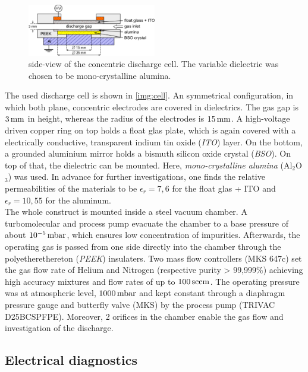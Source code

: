 \documentclass[a4paper,10pt,twoside]{article}
\newcommand{\tenpo}[1]{ 10^{#1}}
\newcommand{\tilt}[1]{\textit{#1}}
\begin{document}
				\begin{figure}
					\centering
					\includegraphics[width=0.5\textwidth]{figures/setup/discharge_cell.pdf}
					\caption{side-view of the concentric discharge cell. The variable dielectric was chosen to be mono-crystalline alumina.}
					\label{img:cell}
				\end{figure}
		
			The used discharge cell is shown in \autoref{img:cell}. An symmetrical configuration, in which both plane, concentric electrodes are covered in dielectrics. The gas gap is $\unit[3]{mm}$ in height, whereas the radius of the electrodes is $\unit[15]{mm}$. A high-voltage driven copper ring on top holds a float glas plate, which is again covered with a electrically conductive, transparent indium tin oxide  (\tilt{ITO}) layer. On the bottom, a grounded aluminium mirror holds a bismuth silicon oxide crystal (\tilt{BSO}). On top of that, the dielectric can be mounted. Here, \tilt{mono-crystalline alumina} (Al$_2$O$_3$) was used. In advance for further investigations, one finds the relative permeabilities of the materials to be $\epsilon_r=7,6$ for the float glas + ITO and $\epsilon_r=10,55$ for the aluminum.\\
			The whole construct is mounted inside a steel vacuum chamber. A turbomolecular and process pump evacuate the chamber to a base pressure of about $\unit[\tenpo{-5}]{mbar}$, which ensures low concentration of impurities. Afterwards, the operating gas is passed from one side directly into the chamber through the polyetherethereton (\tilt{PEEK}) insulaters. Two mass flow controllers (MKS 647c) set the gas flow rate of Helium and Nitrogen (respective purity > 99,999\%) achieving high accuracy mixtures and flow rates of up to $\unit[100]{sccm}$. The operating pressure was at atmospheric level, $\unit[1000]{mbar}$ and kept constant through a diaphragm pressure gauge and butterfly valve (MKS) by the process pump (TRIVAC D25BCSPFPE). Moreover, 2 orifices in the chamber enable the gas flow and investigation of the discharge.\\
			

		\subsection{Electrical diagnostics}
		
\end{document}
